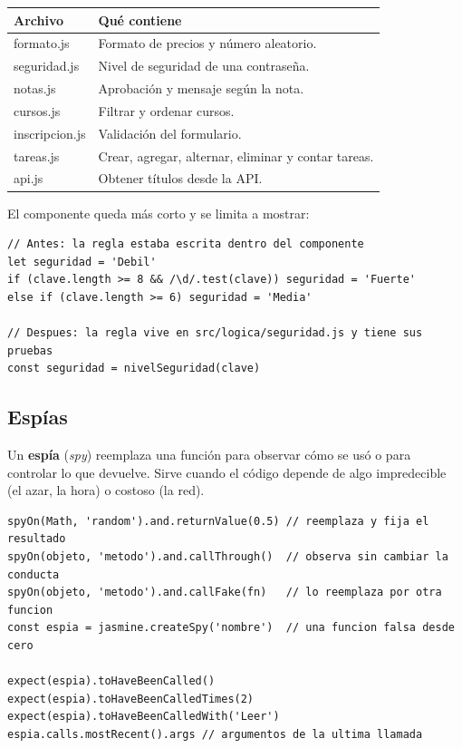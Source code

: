 \documentclass[11pt,a4paper]{article}
\begin{document}
\begin{center}
\small
\begin{tabular}{>{\ttfamily}l p{8.7cm}}
\toprule
\textrm{\textbf{Archivo}} & \textbf{Qué contiene} \\
\midrule
formato.js & Formato de precios y número aleatorio. \\
seguridad.js & Nivel de seguridad de una contraseña. \\
notas.js & Aprobación y mensaje según la nota. \\
cursos.js & Filtrar y ordenar cursos. \\
inscripcion.js & Validación del formulario. \\
tareas.js & Crear, agregar, alternar, eliminar y contar tareas. \\
api.js & Obtener títulos desde la API. \\
\bottomrule
\end{tabular}
\end{center}

El componente queda más corto y se limita a mostrar:
\begin{lstlisting}[language=JSX]
// Antes: la regla estaba escrita dentro del componente
let seguridad = 'Debil'
if (clave.length >= 8 && /\d/.test(clave)) seguridad = 'Fuerte'
else if (clave.length >= 6) seguridad = 'Media'

// Despues: la regla vive en src/logica/seguridad.js y tiene sus pruebas
const seguridad = nivelSeguridad(clave)
\end{lstlisting}

\subsection{Espías}

Un \textbf{espía} (\emph{spy}) reemplaza una función para observar cómo se usó o para controlar lo que devuelve. Sirve cuando el código depende de algo impredecible (el azar, la hora) o costoso (la red).

\begin{lstlisting}[language=JSX]
spyOn(Math, 'random').and.returnValue(0.5) // reemplaza y fija el resultado
spyOn(objeto, 'metodo').and.callThrough()  // observa sin cambiar la conducta
spyOn(objeto, 'metodo').and.callFake(fn)   // lo reemplaza por otra funcion
const espia = jasmine.createSpy('nombre')  // una funcion falsa desde cero

expect(espia).toHaveBeenCalled()
expect(espia).toHaveBeenCalledTimes(2)
expect(espia).toHaveBeenCalledWith('Leer')
espia.calls.mostRecent().args // argumentos de la ultima llamada
\end{lstlisting}
\end{document}
